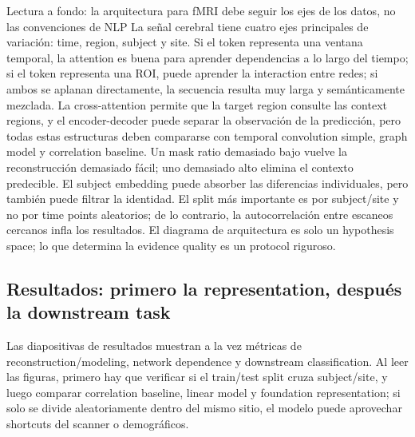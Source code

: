 
\begin{knowledgebox}{Lectura a fondo: la arquitectura para fMRI debe seguir los ejes de los datos, no las convenciones de NLP}
La señal cerebral tiene cuatro ejes principales de variación: time, region, subject y site. Si el token representa una ventana temporal, la attention es buena para aprender dependencias a lo largo del tiempo; si el token representa una ROI, puede aprender la interaction entre redes; si ambos se aplanan directamente, la secuencia resulta muy larga y semánticamente mezclada. La cross-attention permite que la target region consulte las context regions, y el encoder-decoder puede separar la observación de la predicción, pero todas estas estructuras deben compararse con temporal convolution simple, graph model y correlation baseline. Un mask ratio demasiado bajo vuelve la reconstrucción demasiado fácil; uno demasiado alto elimina el contexto predecible. El subject embedding puede absorber las diferencias individuales, pero también puede filtrar la identidad. El split más importante es por subject/site y no por time points aleatorios; de lo contrario, la autocorrelación entre escaneos cercanos infla los resultados. El diagrama de arquitectura es solo un hypothesis space; lo que determina la evidence quality es un protocol riguroso.
\end{knowledgebox}

\subsection{Resultados: primero la representation, después la downstream task}

Las diapositivas de resultados muestran a la vez métricas de reconstruction/modeling, network dependence y downstream classification. Al leer las figuras, primero hay que verificar si el train/test split cruza subject/site, y luego comparar correlation baseline, linear model y foundation representation; si solo se divide aleatoriamente dentro del mismo sitio, el modelo puede aprovechar shortcuts del scanner o demográficos.






